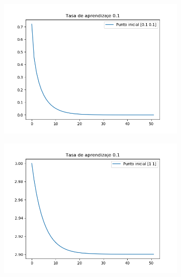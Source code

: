 \documentclass[12pt,a4paper]{article}
\begin{document}
\begin{figure}[H]
	\begin{subfigure}{0.24\textwidth}
		\centering
		\includegraphics[scale=0.3]{./Imagenes/bonus8.png}
	\end{subfigure}
	\begin{subfigure}{0.24\textwidth}
		\centering
		\includegraphics[scale=0.3]{./Imagenes/bonus9.png}
	\end{subfigure}
	\begin{subfigure}{0.24\textwidth}
		\centering

\end{subfigure}
\end{figure}
\end{document}
